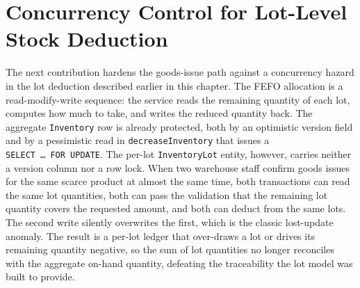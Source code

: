 \section{Concurrency Control for Lot-Level Stock Deduction}
The next contribution hardens the goods-issue path against a concurrency
hazard in the lot deduction described earlier in this chapter. The FEFO
allocation is a read-modify-write sequence: the service reads the remaining
quantity of each lot, computes how much to take, and writes the reduced
quantity back. The aggregate \texttt{Inventory} row is already protected, both
by an optimistic version field and by a pessimistic read in
\texttt{decreaseInventory} that issues a \texttt{SELECT~\dots~FOR~UPDATE}. The
per-lot \texttt{InventoryLot} entity, however, carries neither a version column
nor a row lock. When two warehouse staff confirm goods issues for the same
scarce product at almost the same time, both transactions can read the same lot
quantities, both can pass the validation that the remaining lot quantity covers
the requested amount, and both can deduct from the same lots. The second write
silently overwrites the first, which is the classic lost-update anomaly. The
result is a per-lot ledger that over-draws a lot or drives its remaining
quantity negative, so the sum of lot quantities no longer reconciles with the
aggregate on-hand quantity, defeating the traceability the lot model was built
to provide.

